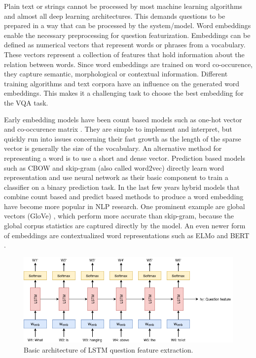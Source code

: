 \documentclass{article}
\begin{document}
Plain text or strings cannot be processed by most machine learning algorithms and almost all deep learning architectures. This demands questions to be prepared in a way that can be processed by the system/model. Word embeddings enable the necessary preprocessing for question featurization. Embeddings can be defined as numerical vectors that represent words or phrases from a vocabulary. These vectors represent a collection of features that hold information about the relation between words. Since word embeddings are trained on word co-occurence, they capture semantic, morphological or contextual information. Different training algorithms and text corpora have an influence on the generated word embeddings. This makes it a challenging task to choose the best embedding for the VQA task.

Early embedding models have been count based models such as one-hot vector and co-occurence matrix \citep{miller1991contextual}. They are simple to implement and interpret, but quickly run into issues concerning their fast growth as the length of the sparse vector is generally the size of the vocabulary. An alternative method for representing a word is to use a short and dense vector. Prediction based models such as CBOW and skip-gram (also called word2vec) \citep{mikolov2013efficient} directly learn word representation and use neural network as their basic component to train a classifier on a binary prediction task. In the last few years hybrid models that combine count based and predict based methods to produce a word embedding have become more popular in NLP research. One prominent example are global vectors (GloVe) \citep{pennington2014glove}, which perform more accurate than skip-gram, because the global corpus statistics are captured directly by the model. An even newer form of embeddings are contextualized word representations such as ELMo \citep{peters2018elmo} and BERT \citep{devlin-etal-2019-bert}.

\begin{figure}[H]
	\centering
	\includegraphics[width=\linewidth]{lstm.png}
	\caption{Basic architecture of LSTM question feature extraction.}
	\label{fig:lstm}
\end{figure}
\end{document}
